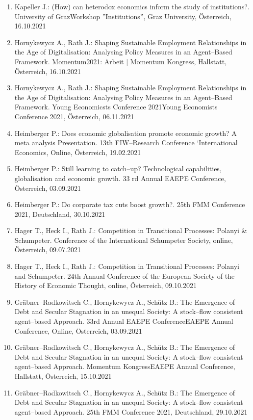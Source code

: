 \begin{enumerate}
	\item Kapeller J.: (How) can heterodox economics inform the study of institutions?. University of GrazWorkshop ''Institutions'', Graz University, Österreich, 16.10.2021
	\item Hornykewycz A., Rath J.: Shaping Sustainable Employment Relationships in the Age of Digitalisation: Analysing Policy Measures in an Agent--Based Framework. Momentum2021: Arbeit | Momentum Kongress, Hallstatt, Österreich, 16.10.2021
	\item Hornykewycz A., Rath J.: Shaping Sustainable Employment Relationships in the Age of Digitalisation: Analysing Policy Measures in an Agent--Based Framework. Young Economicsts Conference 2021Young Economists Conference 2021, Österreich, 06.11.2021
	\item Heimberger P.: Does economic globalisation promote economic growth? A meta analysis Presentation. 13th FIW--Research Conference ‘International Economics, Online, Österreich, 19.02.2021
	\item Heimberger P.: Still learning to catch--up? Technological capabilities, globalisation and economic growth. 33 rd Annual EAEPE Conference, Österreich, 03.09.2021
	\item Heimberger P.: Do corporate tax cuts boost growth?. 25th FMM Conference 2021, Deutschland, 30.10.2021
	\item Hager T., Heck I., Rath J.: Competition in Transitional Processes: Polanyi \& Schumpeter. Conference of the International Schumpeter Society, online, Österreich, 09.07.2021
	\item Hager T., Heck I., Rath J.: Competition in Transitional Processes: Polanyi and Schumpeter. 24th Annual Conference of the European Society of the History of Economic Thought, online, Österreich, 09.10.2021
	\item Gräbner--Radkowitsch C., Hornykewycz A., Schütz B.: The Emergence of Debt and Secular Stagnation in an unequal Society: A stock--flow consistent agent--based Approach. 33rd Annual EAEPE ConferenceEAEPE Annual Conference, Online, Österreich, 03.09.2021
	\item Gräbner--Radkowitsch C., Hornykewycz A., Schütz B.: The Emergence of Debt and Secular Stagnation in an unequal Society: A stock--flow consistent agent--based Approach. Momentum KongressEAEPE Annual Conference, Hallstatt, Österreich, 15.10.2021
	\item Gräbner--Radkowitsch C., Hornykewycz A., Schütz B.: The Emergence of Debt and Secular Stagnation in an unequal Society: A stock--flow consistent agent--based Approach. 25th FMM Conference 2021, Deutschland, 29.10.2021

\end{enumerate}
